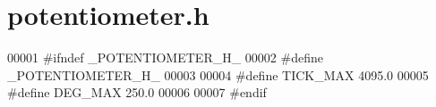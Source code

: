 \section{potentiometer.\+h}
\label{potentiometer_8h_source}

\begin{DoxyCode}
00001 \textcolor{preprocessor}{#ifndef \_POTENTIOMETER\_H\_}
00002 \textcolor{preprocessor}{#define \_POTENTIOMETER\_H\_}
00003 
00004 \textcolor{preprocessor}{#define TICK\_MAX 4095.0}
00005 \textcolor{preprocessor}{#define DEG\_MAX 250.0}
00006 
00007 \textcolor{preprocessor}{#endif}
\end{DoxyCode}
